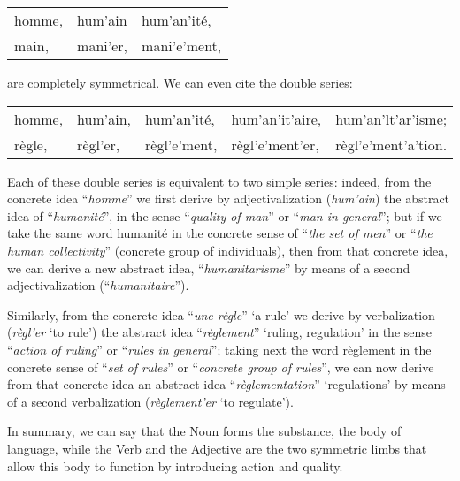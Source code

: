 {    {\centering
      \begin{tabular}[t]{lll}
        \textup{homme}, &\textup{hum'ain} &\textup{hum’an’ité,}\\
        \textup{main}, &\textup{mani'er}, &\textup{mani'e'ment},
      \end{tabular}
      \par}\vspace*{1ex}

    \noindent
    are completely symmetrical. We can even cite the double series:\vspace*{1ex}

    {\centering
      \begin{tabular}[t]{lllll}
        \textup{homme},& \textup{hum'ain},& \textup{hum'an’ité},&
                                                                  \textup{hum'an’it'aire},&
                                                                                            \textup{hum'an'lt'ar'isme};\\        
        \textup{règle}, &\textup{règl'er}, &\textup{règl'e'ment},&
                                                                   \textup{règl'e'ment'er},&
                                                                                             \textup{règl'e'ment'a'tion}.  
      \end{tabular}
      \par}\vspace*{1ex}

    Each of these double series is equivalent to two simple series:
    indeed, from the concrete idea ``\emph{homme}'' we first derive by
    adjectivalization (\emph{hum'ain}) the abstract idea of
    ``\emph{humanité}'', in the sense ``\emph{quality of man}'' or
    ``\emph{man in general}''; but if we take the same word
    \textup{humanité} in the concrete sense of ``\emph{the set of
      men}'' or ``\emph{the human collectivity}'' (concrete group of
    individuals), then from that concrete idea, we can derive a new
    abstract idea, ``\emph{humanitarisme}'' by means of a second
    adjectivalization (``\emph{humanitaire}'').

    Similarly, from the concrete idea ``\emph{une règle}'' `a rule'
    we derive by verbalization (\emph{règl'er} `to rule') the
    abstract idea ``\emph{règlement}'' `ruling, regulation' in the
    sense ``\emph{action of ruling}'' or ``\emph{rules in general}'';
    taking next the word \textup{règlement} in the concrete sense of
    ``\emph{set of rules}'' or ``\emph{concrete group of rules}'', we
    can now derive from that concrete idea an abstract idea
    ``\emph{règlementation}'' `regulations' by means of a second
    verbalization (\emph{règlement'er} `to regulate').\largerpage[2]

    In summary, we can say that the Noun forms the substance, the body
    of language, while the Verb and the Adjective are the two
    symmetric limbs that allow this body to function by introducing
    action and quality.
    }

